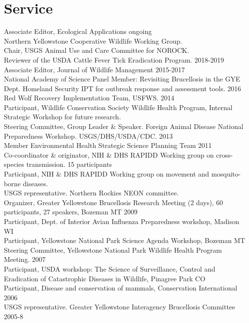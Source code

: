 \documentclass[12pt,]{article}
\begin{document}
\hypertarget{service}{%
\section{Service}\label{service}}

Associate Editor, Ecological Applications \hfill ongoing\\
Northern Yellowstone Cooperative Wildlife Working Group.\\
Chair, USGS Animal Use and Care Committee for NOROCK.\\
Reviewer of the USDA Cattle Fever Tick Eradication Program.
\hfill 2018-2019\\
Associate Editor, Journal of Wildlife Management \hfill 2015-2017\\
National Academy of Science Panel Member: Revisiting Brucellosis in the
GYE\\
Dept. Homeland Security IPT for outbreak response and assessment tools.
\hfill 2016\\
Red Wolf Recovery Implementation Team, USFWS. \hfill 2014\\
Participant, Wildlife Conservation Society Wildlife Health Program,
Internal Strategic Workshop for future research.\\
Steering Committee, Group Leader \& Speaker. Foreign Animal Disease
National Preparedness Workshop. USGS/DHS/USDA/CDC. \hfill 2013\\
Member Environmental Health Strategic Science Planning Team
\hfill 2011\\
Co-coordinator \& originator, NIH \& DHS RAPIDD Working group on
cross-species transmission. 15 participants\\
Participant, NIH \& DHS RAPIDD Working group on movement and
mosquito-borne diseases.\\
USGS representative. Northern Rockies NEON committee.\\
Organizer, Greater Yellowstone Brucellosis Research Meeting (2 days), 60
participants, 27 speakers, Bozeman MT \hfill 2009\\
Participant, Dept. of Interior Avian Influenza Preparedness workshop,
Madison WI\\
Participant, Yellowstone National Park Science Agenda Workshop, Bozeman
MT\\
Steering Committee, Yellowstone National Park Wildlife Health Program
Meeting. \hfill 2007\\
Participant, USDA workshop: The Science of Surveillance, Control and
Eradication of Catastrophic Diseases in Wildlife, Pinagree Park CO\\
Participant, Disease and conservation of mammals, Conservation
International \hfill 2006\\
USGS representative. Greater Yellowstone Interagency Brucellosis
Committee \hfill 2005-8
\end{document}
